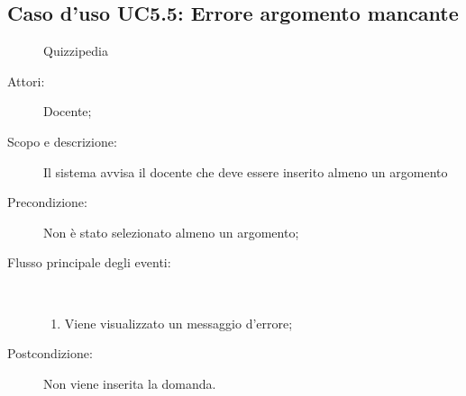 \subsection{Caso d'uso UC5.5: Errore argomento mancante}
	\begin{figure}[H]
		\centering
		\begin{resizedtikzpicture}{\textwidth}
		\begin{umlsystem}[x=0, fill=lightgray!20]{Quizzipedia}
		\end{umlsystem}
		\end{resizedtikzpicture}
		\caption{}
	\end{figure}
\begin{description}
\item[Attori:] Docente;
\item[Scopo e descrizione:] Il sistema avvisa il docente che deve essere inserito almeno un argomento
      \item[Precondizione:] Non è stato selezionato almeno un argomento;

        \item[Flusso principale degli eventi:] \ 
 \begin{enumerate}
          \item Viene visualizzato un messaggio d'errore;

      \end{enumerate}
    \item[Postcondizione:] Non viene inserita la domanda.
  \end{description}
\hypertarget{UC5.6}{}
